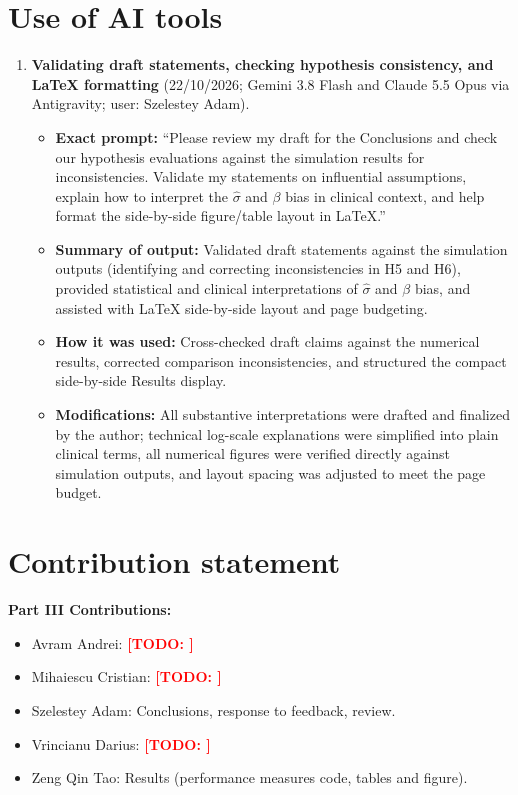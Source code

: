 \documentclass[10pt,a4paper]{article}
\newcommand{\todo}[1]{\textcolor{red}{\textbf{[TODO: #1]}}}
\begin{document}
\section*{Use of AI tools}
\begin{enumerate}[leftmargin=1.4em,itemsep=3pt]
\item \textbf{Validating draft statements, checking hypothesis consistency, and LaTeX formatting} (22/10/2026; Gemini 3.8 Flash and Claude 5.5 Opus via Antigravity; user: Szelestey Adam).
\begin{itemize}[leftmargin=1.2em,itemsep=1pt]
\item \textbf{Exact prompt:} ``Please review my draft for the Conclusions and check our hypothesis evaluations against the simulation results for inconsistencies. Validate my statements on influential assumptions, explain how to interpret the $\hat{\sigma}$ and $\beta$ bias in clinical context, and help format the side-by-side figure/table layout in LaTeX.''
\item \textbf{Summary of output:} Validated draft statements against the simulation outputs (identifying and correcting inconsistencies in H5 and H6), provided statistical and clinical interpretations of $\hat{\sigma}$ and $\beta$ bias, and assisted with LaTeX side-by-side layout and page budgeting.
\item \textbf{How it was used:} Cross-checked draft claims against the numerical results, corrected comparison inconsistencies, and structured the compact side-by-side Results display.
\item \textbf{Modifications:} All substantive interpretations were drafted and finalized by the author; technical log-scale explanations were simplified into plain clinical terms, all numerical figures were verified directly against simulation outputs, and layout spacing was adjusted to meet the page budget.
\end{itemize}
\end{enumerate}


\section*{Contribution statement}
\textbf{Part III Contributions:}
\begin{itemize}[leftmargin=1.2em,itemsep=2pt]
\item Avram Andrei: \todo{}
\item Mihaiescu Cristian: \todo{}
\item Szelestey Adam: Conclusions, response to feedback, review.
\item Vrincianu Darius: \todo{}
\item Zeng Qin Tao: Results (performance measures code, tables and figure).
\end{itemize}
\end{document}
